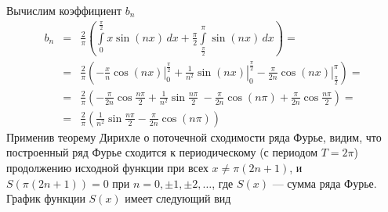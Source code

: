 \noindent
Вычислим коэффициент $b_n$
$$
\begin{array}{rcl}
b_n &=& \displaystyle\frac{2}{\pi}\left(
	\int\limits_0^\frac{\pi}{2}
	x\sin \left(nx\right)\,dx + \frac{\pi}{2}\int\limits_\frac{\pi}{2}^\pi
	\sin \left(nx\right)\,dx \right) ={}									\\[12pt]
	&=& \displaystyle\frac{2}{\pi}\left(
	-\left.\frac{x}{n}\cos\left(nx\right)\right|_0^\frac{\pi}{2}
	+\left.\frac{1}{n^2}\sin\left(nx\right)\right|_0^\frac{\pi}{2} 
	-\left.\frac{\pi}{2n}\cos\left(nx\right)\right|_\frac{\pi}{2}^\pi\right) =
	\\[12pt]
	&=& \displaystyle\frac{2}{\pi}\left(
	-\frac{\pi}{2n}\cos\frac{n \pi}{2}
	+\frac{1}{n^2}\sin\frac{n \pi}{2}\
	-\frac{\pi}{2n}\cos\left(n \pi\right)
	+\frac{\pi}{2n}\cos\frac{n \pi}{2}\right) =
	\\[12pt]
	&=& \displaystyle\frac{2}{\pi}\left(\frac{1}{n^2}\sin\frac{n \pi}{2}-\frac{\pi}{2n}\cos\left(n \pi\right)\right)
\end{array}
 $$
Применив теорему Дирихле о поточечной сходимости ряда Фурье, видим, что построенный ряд Фурье сходится к периодическому (с периодом $T=2 \pi$) продолжению исходной функции при всех $x\ne \pi(2n+1)$, и 
$S(\pi(2n+1))=0$ при $n=0,\pm1,\pm2,\ldots$, где $S(x)$ --- сумма ряда Фурье. 
График функции $S(x)$ имеет следующий вид

